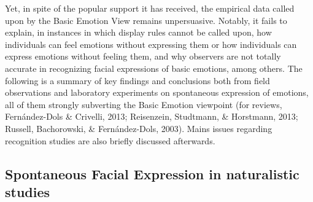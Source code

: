 \documentclass[
  english,
  doc]{apa7}
\begin{document}
Yet, in spite of the popular support it has received, the empirical data called upon by the Basic Emotion View remains unpersuasive. Notably, it fails to explain, in instances in which display rules cannot be called upon, how individuals can feel emotions without expressing them or how individuals can express emotions without feeling them, and why observers are not totally accurate in recognizing facial expressions of basic emotions, among others. The following is a summary of key findings and conclusions both from field observations and laboratory experiments on spontaneous expression of emotions, all of them strongly subverting the Basic Emotion viewpoint (for reviews, Fernández-Dols \& Crivelli, 2013; Reisenzein, Studtmann, \& Horstmann, 2013; Russell, Bachorowski, \& Fernández-Dols, 2003). Mains issues regarding recognition studies are also briefly discussed afterwards.

\hypertarget{spontaneous-facial-expression-in-naturalistic-studies}{%
\subsection{Spontaneous Facial Expression in naturalistic studies}\label{spontaneous-facial-expression-in-naturalistic-studies}}
\end{document}
